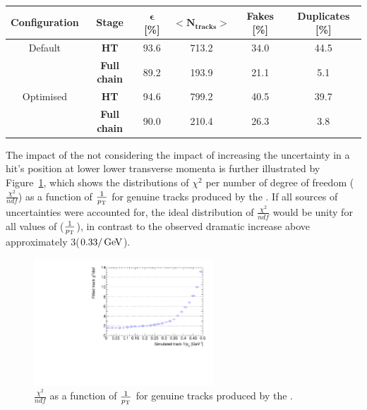 \begin{table}[htbp]
\label{tab:trackFindingPerformance2GeVHT}
  \centering
\begin{tabular}{cccccc}
   \hline
   \bf{Configuration} & \bf{Stage} & \bf{$\bm{\epsilon}$ [\%]} & $\bm{<N_{tracks}>}$ & \bf{Fakes [\%]} & \bf{Duplicates [\%]}  \\
        \hline
    Default & \bf{HT}     & 93.6 & 713.2 & 34.0 & 44.5 \\  
    & \bf{Full chain}     & 89.2 & 193.9 & 21.1 & 5.1 \\      
    \hline
    Optimised & \bf{HT}     & 94.6 & 799.2 & 40.5 & 39.7 \\  
    & \bf{Full chain}     & 90.0 & 210.4 & 26.3 & 3.8 \\      
   \hline
   
 \end{tabular}%
\end{table}

The impact of the \KF not considering the impact of \MS increasing the uncertainty in a hit's position at lower lower transverse momenta is further illustrated by Figure~\ref{fig:2GeVFlatChi2Ndf}, which shows the distributions of $\chi^{2}$ per number of degree of freedom ($\frac{\chi^{2}}{ndf}$) as a function of $\frac{1}{p_{\mathrm{T}}}$ for genuine tracks produced by the \KF.
If all sources of uncertainties were accounted for, the ideal distribution of $\frac{\chi^{2}}{ndf}$ would be unity for all values of \pT ($\frac{1}{p_{\mathrm{T}}}$), in contrast to the observed dramatic increase above approximately 3\GeV ($0.33/\,\text{Ge\hspace{-.08em}V}$).

\begin{figure}[htb]
\centering
\includegraphics[width=0.60\textwidth]{figs/tk-upgrade/results-lowPtTracking/kfChi2NdfVsInvPtFlatGeometry_5000.pdf}
\caption{$\frac{\chi^{2}}{ndf}$ as a function of $\frac{1}{p_{\mathrm{T}}}$ for genuine tracks produced by the \KF.}
\label{fig:2GeVFlatChi2Ndf}
\end{figure}

